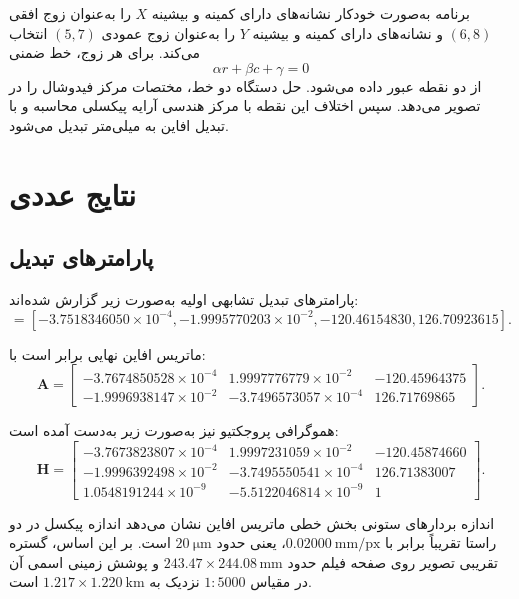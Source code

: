 \documentclass[12pt,a4paper]{article}
\newcommand{\unit}[1]{\text{\lr{#1}}}
\renewcommand{\unit}[1]{\ensuremath{\mathrm{#1}}}
\begin{document}
برنامه به‌صورت خودکار نشانه‌های دارای کمینه و بیشینه \(X\) را به‌عنوان زوج افقی
\((6,8)\) و نشانه‌های دارای کمینه و بیشینه \(Y\) را به‌عنوان زوج عمودی
\((5,7)\) انتخاب می‌کند. برای هر زوج، خط ضمنی
\begin{equation}
\alpha r+\beta c+\gamma=0
\end{equation}
از دو نقطه عبور داده می‌شود. حل دستگاه دو خط، مختصات مرکز فیدوشال را در تصویر
می‌دهد. سپس اختلاف این نقطه با مرکز هندسی آرایه پیکسلی محاسبه و با تبدیل افاین به
میلی‌متر تبدیل می‌شود.

\section{نتایج عددی}

\subsection{پارامترهای تبدیل}

پارامترهای تبدیل تشابهی اولیه به‌صورت زیر گزارش شده‌اند:
\begin{equation}
[a,b,t_x,t_y]=
[-3.7518346050{\times}10^{-4},
-1.9995770203{\times}10^{-2},
-120.46154830,
126.70923615].
\end{equation}

ماتریس افاین نهایی برابر است با:
\begin{equation}
\mathbf{A}=
\begin{bmatrix}
-3.7674850528{\times}10^{-4} &
 1.9997776779{\times}10^{-2} &
-120.45964375\\
-1.9996938147{\times}10^{-2} &
-3.7496573057{\times}10^{-4} &
126.71769865
\end{bmatrix}.
\end{equation}

هموگرافی پروجکتیو نیز به‌صورت زیر به‌دست آمده است:
\begin{equation}
\mathbf{H}=
\begin{bmatrix}
-3.7673823807{\times}10^{-4} &
 1.9997231059{\times}10^{-2} &
-120.45874660\\
-1.9996392498{\times}10^{-2} &
-3.7495550541{\times}10^{-4} &
126.71383007\\
 1.0548191244{\times}10^{-9} &
-5.5122046814{\times}10^{-9} &
1
\end{bmatrix}.
\end{equation}

اندازه بردارهای ستونی بخش خطی ماتریس افاین نشان می‌دهد اندازه پیکسل در دو راستا
تقریباً برابر با \(0.02000~\unit{mm/px}\)، یعنی حدود \(20~\unit{\mu m}\) است.
بر این اساس، گستره تقریبی تصویر روی صفحه فیلم حدود
\(243.47\times244.08\,\mathrm{mm}\) و پوشش زمینی اسمی آن در مقیاس \(1:5000\) نزدیک
به \(1.217\times1.220~\unit{km}\) است.
\end{document}
